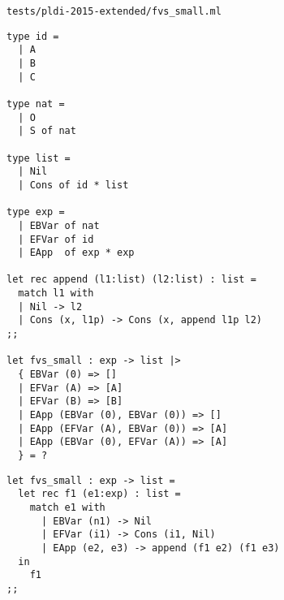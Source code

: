 \noindent\large\texttt{tests/pldi-2015-extended/fvs\_small.ml}
\begin{verbatim}
type id =
  | A
  | B
  | C

type nat =
  | O
  | S of nat

type list =
  | Nil
  | Cons of id * list

type exp =
  | EBVar of nat
  | EFVar of id
  | EApp  of exp * exp

let rec append (l1:list) (l2:list) : list =
  match l1 with
  | Nil -> l2
  | Cons (x, l1p) -> Cons (x, append l1p l2)
;;

let fvs_small : exp -> list |>
  { EBVar (0) => []
  | EFVar (A) => [A]
  | EFVar (B) => [B]
  | EApp (EBVar (0), EBVar (0)) => []
  | EApp (EFVar (A), EBVar (0)) => [A]
  | EApp (EBVar (0), EFVar (A)) => [A]
  } = ?
\end{verbatim}

\begin{verbatim}
let fvs_small : exp -> list =
  let rec f1 (e1:exp) : list =
    match e1 with
      | EBVar (n1) -> Nil
      | EFVar (i1) -> Cons (i1, Nil)
      | EApp (e2, e3) -> append (f1 e2) (f1 e3)
  in
    f1
;;
\end{verbatim}


